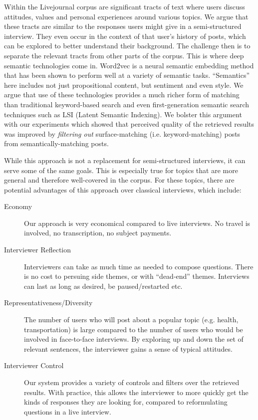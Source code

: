 \documentclass{sigchi}
\begin{document}
Within the Livejournal corpus are significant tracts of text where users discuss attitudes, values
and personal experiences around various topics. We argue that these tracts are similar to the
responses users might give in a semi-structured interview. They even occur in the context of that
user's history of posts, which can be explored to better understand their background. The challenge
then is to separate the relevant tracts from other parts of the corpus. This is where deep semantic
technologies come in. Word2vec is a neural semantic embedding method that has been shown to perform
well at a variety of semantic tasks. ``Semantics'' here includes not just propositional content,
but sentiment and even style. We argue that use of these technologies provides a much richer form
of matching than traditional keyword-based search and even first-generation semantic search
techniques such as LSI (Latent Semantic Indexing). We bolster this argument with our experiments
which showed that perceived quality of the retrieved results was improved by {\em filtering out}
surface-matching (i.e. keyword-matching) posts from semantically-matching posts.

While this approach is not a replacement for semi-structured interviews, it can serve some of the
same goals. This is especially true for topics that are more general and therefore well-covered in
the corpus. For these topics, there are potential advantages of this approach over classical
interviews, which include:

\begin{description}
\item[Economy] Our approach is very economical compared to live interviews. No travel is involved,
  no transcription, no subject payments.
\item[Interviewer Reflection] Interviewers can take as much time as needed to compose questions.
  There is no cost to persuing side themes, or with ``dead-end'' themes. Interviews can last as long
  as desired, be paused/restarted etc. 
\item[Representativeness/Diversity] The number of users who will post about a popular topic (e.g. health,
  transportation) is large compared to the number of users who would be involved in face-to-face
  interviews. By exploring up and down the set of relevant sentences, the interviewer gains a
  sense of typical attitudes.
\item[Interviewer Control] Our system provides a variety of controls and filters over the retrieved
  results. With practice, this allows the interviewer to more quickly get the kinds of responses
  they are looking for, compared to reformulating questions in a live interview. 
\end{description}
\end{document}
